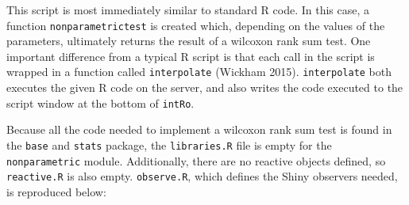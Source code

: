 \documentclass[12pt,]{article}
\newenvironment{Shaded}{\begin{snugshade}}{\end{snugshade}}
\newcommand{\KeywordTok}[1]{\textcolor[rgb]{0.13,0.29,0.53}{\textbf{{#1}}}}
\newcommand{\DataTypeTok}[1]{\textcolor[rgb]{0.13,0.29,0.53}{{#1}}}
\newcommand{\StringTok}[1]{\textcolor[rgb]{0.31,0.60,0.02}{{#1}}}
\newcommand{\NormalTok}[1]{{#1}}
\begin{document}
\begin{Shaded}
\end{Shaded}

This script is most immediately similar to standard R code. In this
case, a function \texttt{nonparametrictest} is created which, depending
on the values of the parameters, ultimately returns the result of a
wilcoxon rank sum test. One important difference from a typical R script
is that each call in the script is wrapped in a function called
\texttt{interpolate} (Wickham 2015). \texttt{interpolate} both executes
the given R code on the server, and also writes the code executed to the
script window at the bottom of \texttt{intRo}.

Because all the code needed to implement a wilcoxon rank sum test is
found in the \texttt{base} and \texttt{stats} package, the
\texttt{libraries.R} file is empty for the \texttt{nonparametric}
module. Additionally, there are no reactive objects defined, so
\texttt{reactive.R} is also empty. \texttt{observe.R}, which defines the
Shiny observers needed, is reproduced below:
\end{document}
